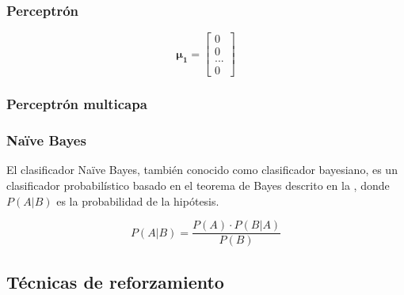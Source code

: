 \begin{figure}[H]
	\centering
	
	\label{fig:svm}
\end{figure}

\subsubsection*{Perceptrón}

\begin{figure}[H]
	\centering
	
	\label{fig:perceptron}
\end{figure}

\begin{equation}
 \pmb{\mu_1} = \begin{bmatrix}0\\0\\...\\0\end{bmatrix}
\end{equation}

\subsubsection*{Perceptrón multicapa}

\begin{figure}[H]
	\centering
	
	\label{fig:multilayer-perceptron}
\end{figure}

\subsubsection*{Na\"ive Bayes}
El clasificador Na\"ive Bayes, también conocido como clasificador bayesiano, es un clasificador probabilístico basado en el teorema de Bayes descrito en la , donde $P(A|B)$ es la probabilidad de la hipótesis.

\begin{equation}
 P(A|B) = \frac{P(A) \cdot P(B|A)}{P(B)}
 \label{eq:naive-bayes}
\end{equation}


\subsection{Técnicas de reforzamiento}


